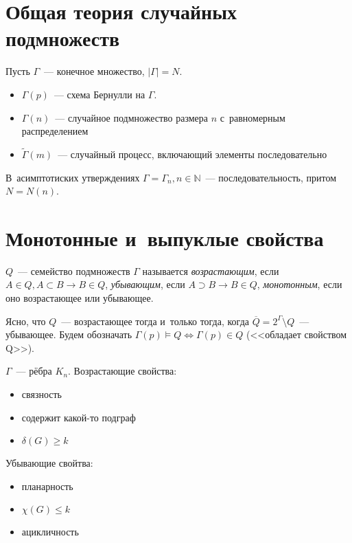 \documentclass{article}
\begin{document}
\section{Общая теория случайных подмножеств}

Пусть $\Gamma$~--- конечное множество, $|\Gamma| = N$.
\begin{itemize}
	\item $\Gamma(p)$~--- схема Бернулли на $\Gamma$.
	\item $\Gamma(n)$~--- случайное подмножество размера $n$ с~равномерным
		распределением
	\item $\tilde\Gamma(m)$~--- случайный процесс, включающий элементы
		последовательно
\end{itemize}

В~асимптотиских утверждениях $\Gamma = \Gamma_n, n \in \mathbb{N}$~---
последовательность, притом $N=N(n)$.

\section{Монотонные и~выпуклые свойства}

\begin{definition}
	$Q$~--- семейство подмножеств $\Gamma$ называется \emph{возрастающим}, если
	$A \in Q, A \subset B \rightarrow B \in Q$, \emph{убывающим}, если $A \supset
	B \rightarrow B \in Q$, \emph{монотонным}, если оно возрастающее или
	убывающее.
\end{definition}

Ясно, что $Q$~--- возрастающее тогда и~только тогда, когда $\overline{Q} =
2^\Gamma \setminus Q$~--- убывающее. Будем обозначать $\Gamma(p) \models Q
\Leftrightarrow \Gamma(p) \in Q$ (<<обладает свойством Q>>).

\begin{example}
	$\Gamma$~--- рёбра $K_n$. Возрастающие свойства:
	\begin{itemize}
		\item связность
		\item содержит какой-то подграф
		\item $\delta(G) \ge k$
	\end{itemize}
	Убывающие свойтва:
	\begin{itemize}
		\item планарность
		\item $\chi(G) \le k$
		\item ацикличность
	\end{itemize}
\end{example}
\end{document}
